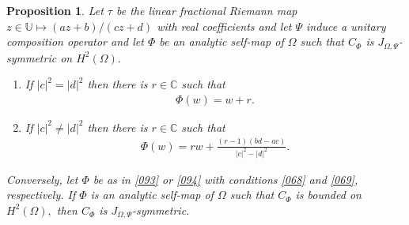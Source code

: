 \documentclass[11pt]{amsart}%
\newtheorem{pps}[thm]{Proposition}
\theoremstyle{definition}
\theoremstyle{remark}
\numberwithin{equation}{section}
\begin{document}
\begin{pps}
\label{091}  Let $\tau$ be the linear fractional Riemann map $z\in \mathbb{U} \mapsto (az+b)/(cz+d)$ with real coefficients and let $\Psi$ induce a unitary
composition operator and let $\Phi$ be an analytic self-map of $\Omega$ such that
$C_{\Phi}$ is $J_{\Omega,\Psi}$-symmetric on $H^{2}(\Omega).$ 

\begin{enumerate}
\item \label{068} If $|c|^{2}=|d|^{2}$ then there is $r\in\mathbb{C}$ such
that
\begin{align}
\label{093}\Phi(w)=w+r.
\end{align}


\item \label{069} If $|c|^{2}\neq|d|^{2}$ then there is $r\in\mathbb{C}$ such
that
\begin{align}
\label{094}\Phi(w)=r w+\frac{(r-1)(bd-ac)}{|c|^{2}-|d|^{2}}.
\end{align}

\end{enumerate}

Conversely, let $\Phi$ be as in \eqref{093} or \eqref{094} with conditions
\eqref{068} and \eqref{069}, respectively. If $\Phi$ is an analytic self-map
of $\Omega$ such that $C_{\Phi}$ is bounded on $H^{2}(\Omega),$ then $C_{\Phi
}$ is $J_{\Omega,\Psi}$-symmetric.
\end{pps}
\end{document}

